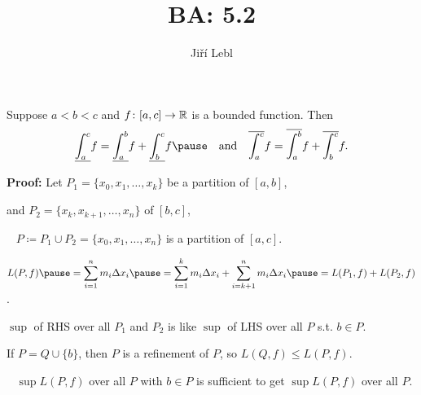 \documentclass[10pt,aspectratio=149]{beamer}
\author{Ji\v{r}\'i Lebl}
\institute[OSU]{%
Departemento pri Matematiko de Oklahoma {\^S}tata Universitato}
\title{BA: 5.2}
\date{}
\begin{document}
\begin{frame}
\titlepage
\end{frame}

\begin{frame}
\begin{lemma}[Additivity]
Suppose $a < b < c$ and $f \colon [a,c] \to {\mathbb{R}}$ is a bounded function.
\pause
Then
\begin{equation*}
\underline{\int_a^c} f
=
\underline{\int_a^b} f
+
\underline{\int_b^c} f
\pause
\quad \text{and} \quad
\overline{\int_a^c} f
=
\overline{\int_a^b} f
+
\overline{\int_b^c} f .
\end{equation*}
\end{lemma}

\pause
\textbf{Proof:}
Let $P_1 = \{ x_0,x_1,\ldots,x_k \}$ be a partition of $[a,b]$,

\pause
and $P_2 = \{ x_k, x_{k+1}, \ldots, x_n \}$ of $[b,c]$,

\pause
\thus~ $P \coloneqq P_1 \cup P_2 = \{ x_0, x_1, \ldots, x_n \}$ is
a partition of $[a,c]$.

\pause
\medskip

\quad $\displaystyle
L(P,f)
\pause
=
\sum_{i=1}^n m_i \Delta x_i
\pause
=
\sum_{i=1}^k m_i \Delta x_i
+
\sum_{i=k+1}^n m_i \Delta x_i
\pause
=
L(P_1,f) + L(P_2,f)$.

\pause
\medskip

$\sup$ of RHS over all $P_1$ and $P_2$ is like
$\sup$ of LHS over all $P$ s.t. $b \in P$.

\pause
\medskip

If $P=Q \cup \{ b \}$, then $P$ is a refinement of $P$, so $L(Q,f) \leq
L(P,f)$.

\pause
\medskip

\thus~ $\sup L(P,f)$ over all $P$ with $b \in P$ is sufficient
to get $\sup L(P,f)$ over all $P$.

\end{frame}
\end{document}
